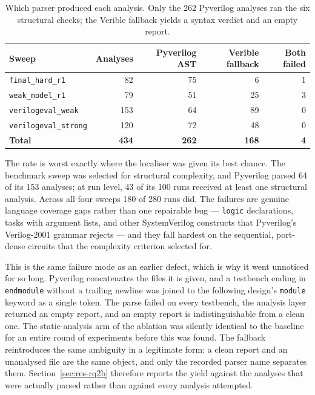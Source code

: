 \documentclass[11pt,a4paper,titlepage=false]{scrreprt}
\begin{document}
\begin{table}[H]
\centering
\small
\begin{tabular}{@{}l r r r r@{}}
\toprule
\textbf{Sweep} & \textbf{Analyses} & \textbf{Pyverilog AST} & \textbf{Verible fallback} & \textbf{Both failed} \\
\midrule
\texttt{final\_hard\_r1}     & 82  & 75 & 6  & 1 \\
\texttt{weak\_model\_r1}     & 79  & 51 & 25 & 3 \\
\texttt{verilogeval\_weak}   & 153 & 64 & 89 & 0 \\
\texttt{verilogeval\_strong} & 120 & 72 & 48 & 0 \\
\midrule
\textbf{Total}               & \textbf{434} & \textbf{262} & \textbf{168} & \textbf{4} \\
\bottomrule
\end{tabular}
\caption{Which parser produced each analysis. Only the 262 Pyverilog analyses ran the six
structural checks; the Verible fallback yields a syntax verdict and an empty report.}
\label{tab:parsers}
\end{table}

The rate is worst exactly where the localiser was given its best chance. The benchmark sweep
was selected for structural complexity, and Pyverilog parsed 64 of its 153 analyses; at run
level, 43 of its 100 runs received at least one structural analysis. Across all four sweeps
180 of 280 runs did. The failures are genuine language coverage gaps rather than one
repairable bug --- \texttt{logic} declarations, tasks with argument lists, and other
SystemVerilog constructs that Pyverilog's Verilog-2001 grammar rejects --- and they fall
hardest on the sequential, port-dense circuits that the complexity criterion selected for.

This is the same failure mode as an earlier defect, which is why it went unnoticed for so
long. Pyverilog concatenates the files it is given, and a testbench ending in
\texttt{endmodule} without a trailing newline was joined to the following design's
\texttt{module} keyword as a single token. The parse failed on every testbench, the analysis
layer returned an empty report, and an empty report is indistinguishable from a clean one.
The static-analysis arm of the ablation was silently identical to the baseline for an entire
round of experiments before this was found. The fallback reintroduces the same ambiguity in
a legitimate form: a clean report and an unanalysed file are the same object, and only the
recorded parser name separates them. Section~\ref{sec:res-rq2b} therefore reports the yield
against the analyses that were actually parsed rather than against every analysis attempted.
\end{document}
